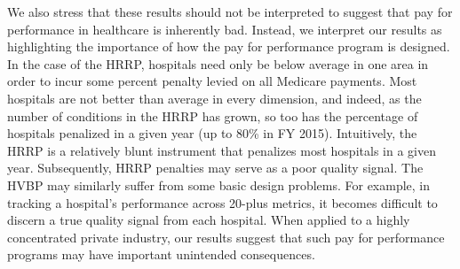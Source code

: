 \documentclass[12pt]{article}
\begin{document}
We also stress that these results should not be interpreted to suggest that pay for performance in healthcare is inherently bad. Instead, we interpret our results as highlighting the importance of how the pay for performance program is designed. In the case of the HRRP, hospitals need only be below average in one area in order to incur some percent penalty levied on all Medicare payments. Most hospitals are not better than average in every dimension, and indeed, as the number of conditions in the HRRP has grown, so too has the percentage of hospitals penalized in a given year (up to 80\% in FY 2015). Intuitively, the HRRP is a relatively blunt instrument that penalizes most hospitals in a given year. Subsequently, HRRP penalties may serve as a poor quality signal. The HVBP may similarly suffer from some basic design problems. For example, in tracking a hospital's performance across 20-plus metrics, it becomes difficult to discern a true quality signal from each hospital. When applied to a highly concentrated private industry, our results suggest that such pay for performance programs may have important unintended consequences.

\newpage




\clearpage
\newpage
\appendix
\end{document}

